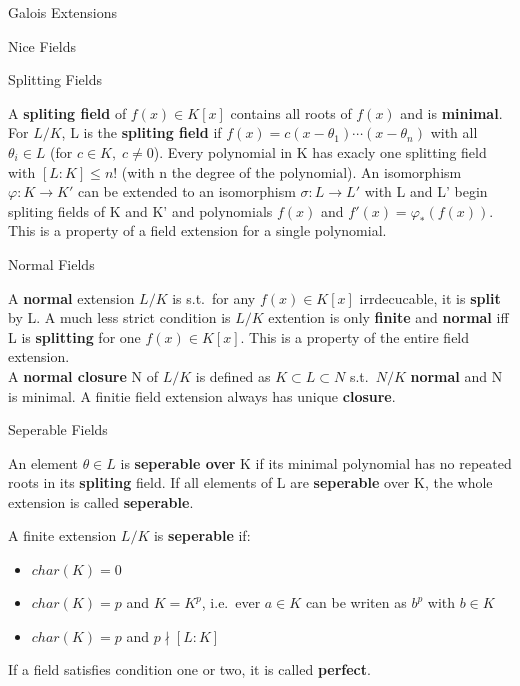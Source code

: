 \documentclass[12pt, letterpaper]{article}
\begin{document}
\begin{section}{Galois Extensions}

  \begin{subsection}{Nice Fields}

    \begin{subsubsection}{Splitting Fields}

      A \textbf{spliting field} of \(f(x) \in K[x]\) contains all roots of
      \(f(x)\) and is \textbf{minimal}. For \(L / K\), L is the \textbf{spliting
        field} if \(f(x) = c(x - \theta_{1}) \cdots (x - \theta_{n})\) with all
      \(\theta_{i} \in L\) (for \(c \in K, \; c \neq 0\)). Every polynomial in K
      has exacly one splitting field with \([L : K] \leq n!\) (with n the degree
      of the polynomial). An isomorphism \(\varphi: K \to K'\) can be extended
      to an isomorphism \(\sigma: L \to L'\) with L and L' begin spliting fields
      of K and K' and polynomials \(f(x)\) and \(f'(x) = \varphi_{*}(f(x))\).
      This is a property of a field extension for a single polynomial.

    \end{subsubsection}

    \begin{subsubsection}{Normal Fields}

      A \textbf{normal} extension \(L / K\) is s.t.\ for any \(f(x) \in K[x]\)
      irrdecucable, it is \textbf{split} by L.
      A much less strict condition is \(L / K\) extention is only
      \textbf{finite} and \textbf{normal} iff L is \textbf{splitting} for one
      \(f(x) \in K[x]\). This is a property of the entire field extension. \\
      A \textbf{normal closure} N of \(L / K\) is defined as \(K \subset L
      \subset N\) s.t.\ \(N / K\) \textbf{normal} and N is minimal. A finitie
      field extension always has unique \textbf{closure}.

    \end{subsubsection}

    \begin{subsubsection}{Seperable Fields}

      An element \(\theta \in L\) is \textbf{seperable over} K if its minimal
      polynomial has no repeated roots in its \textbf{spliting} field. If all
      elements of L are \textbf{seperable} over K, the whole extension is
      called \textbf{seperable}.

      A finite extension \(L / K\) is \textbf{seperable} if:
      \begin{itemize}
        \item \(char(K) = 0\)
        \item \(char(K) = p\) and \(K = K^{p}\), i.e.\ ever \(a \in K\)
              can be writen as \(b^{p}\) with \(b \in K\)
        \item \(char(K) = p\) and \(p \nmid [L : K]\)
      \end{itemize}
      If a field satisfies condition one or two, it is called \textbf{perfect}.


\end{subsubsection}
\end{subsection}
\end{section}
\end{document}
